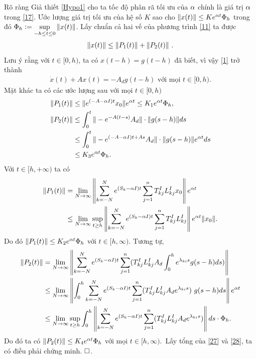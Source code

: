 \begin{cm} Rõ ràng Giả thiết \ref{Hypo1} cho ta tốc độ phân rã tối ưu của $\alpha$ chính là giá trị $\alpha$ trong \eqref{17}. 
%	
Ước lượng giá trị tối ưu của hệ số $K$ sao cho $\Vert x(t) \Vert \le K e^{\alpha t} \Phi_h$ trong đó $\Phi_h := \sup\limits_{-h \le t \le 0} \Vert x(t) \Vert$. 	
Lấy chuẩn cả hai vế của phương trình \eqref{11} ta được
\begin{align}\label{23}
	\Vert x(t) \Vert \le \Vert P_1(t) \Vert + \Vert P_2(t)\Vert \ .
\end{align}	
%
Lưu ý rằng với $t \in [0,h)$, ta có $x(t-h)=g(t-h)$ đã biết, vì vậy \eqref{1} trở thành
\begin{align}\label{24}
	\dot{x}(t) + Ax(t) = -A_dg(t-h) \mbox{ với mọi } t\in [0,h).
\end{align}
%
Mặt khác ta có các ước lượng sau với mọi $t \in [0,h)$
%
\begin{align}\label{25}
	\Vert P_1(t) \Vert &\le \Vert e^{(-A - \alpha I)t}x_0 \Vert e^{\alpha t} \le K_1 e^{\alpha t}\Phi_h, \\
	\Vert P_2(t) \Vert & \le \int_{0}^{t}\Vert -e^{-A(t-s )}A_d \Vert \cdot \Vert g(s  - h) \Vert ds  \notag\\
	&\le \int_{0}^{t}\Vert -e^{(-A - \alpha I)t + As }A_d \Vert \cdot \Vert g(s  - h) \Vert e^{\alpha t}ds  \notag\\
	&\le K_3e^{\alpha t}	\Phi_h.
\end{align}
%
Với $t\in [h,+\infty)$ ta có
\begin{align}\label{27}
	\Vert P_1(t) \Vert &= \lim\limits_{N \to \infty} \left \Vert \sum_{k=-N}^{N}  e^{(S_k-\alpha I)t} \sum_{j =1}^n T^I_{kj}L^I_{kj}x_0 \right \Vert e^{\alpha t} \notag\\
	& \le \lim \limits_{N \to \infty}  \sup \limits_{t \ge h} \left \Vert \sum_{k=-N}^{N}  e^{(S_k - \alpha I)t} \sum_{j =1}^n T^I_{kj} L^I_{kj} \right \Vert e^{\alpha t} \Vert x_0 \Vert.
\end{align}
Do đó $\Vert P_1(t) \Vert \le K_2 e^{\alpha t} \Phi_h$ với $t \in [h,\infty)$. Tương tự,
\begin{align}\label{28}
	\Vert P_2(t)\Vert &= \lim\limits_{N \to \infty} \left\Vert  \sum_{k=-N}^N e^{(S_k - \alpha I)t} \sum_{j =1}^n (T^I_{kj}L^I_{kj}A_d \int_0^h e^{\lambda_{ki}s } g(s  - h) ds )   \right\Vert \notag \\
	& \le \lim\limits_{N\to \infty} \left\Vert \int_0^h  \sum_{k=-N}^N  e^{(S_k - \alpha I)t} \sum_{j=1}^n (T^I_{kj} L^I_{kj}A_de^{\lambda_{ki}s }) \ g(s  - h) ds  \right\Vert e^{\alpha t} \notag \\
	& \le \lim \limits_{N\to \infty} \sup \limits_{t \ge h} \int_0^h \left \Vert \sum_{k=-N}^N  e^{(S_k - \alpha I)t} \sum_{j =1}^n (T^I_{kj}L^I_{kj}A_de^{\lambda_{ki}s }) \right \Vert ds  \cdot  \Phi_h .
\end{align}
Do đó ta có $\Vert P_2(t) \Vert \le K_4e^{\alpha t} \Phi_h$ với mọi $t \in [h,\infty)$.\ Lấy tổng của \eqref{27} và \eqref{28}, ta có điều phải chứng minh. $\hfill \square$.
\end{cm}
